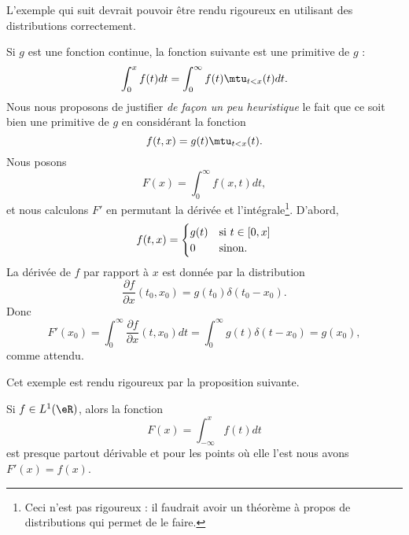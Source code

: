 L'exemple qui suit devrait pouvoir être rendu rigoureux en utilisant des distributions correctement.

\begin{example} \label{ExfYXeQg}
    Si \( g\) est une fonction continue, la fonction suivante est une primitive de \( g\) :
    \begin{equation}
        \int_0^xf(t)dt=\int_0^{\infty}f(t)\mtu_{t<x}(t)dt.
    \end{equation}
    Nous nous proposons de justifier \emph{de façon un peu heuristique} le fait que ce soit bien une primitive de \( g\) en considérant la fonction
    \begin{equation}
        f(t,x)=g(t)\mtu_{t<x}(t).
    \end{equation}
    Nous posons
    \begin{equation}
        F(x)=\int_0^{\infty}f(x,t)dt,
    \end{equation}
    et nous calculons \( F'\) en permutant la dérivée et l'intégrale\footnote{Ceci n'est pas rigoureux : il faudrait avoir un théorème à propos de distributions qui permet de le faire.}. D'abord,
    \begin{equation}
        f(t,x)=\begin{cases}
            g(t)    &   \text{si \( t\in \mathopen[ 0 , x \mathclose]\)}\\
            0    &    \text{sinon.}
        \end{cases}
    \end{equation}
    La dérivée de \( f\) par rapport à \( x\) est donnée par la distribution
    \begin{equation}
        \frac{ \partial f }{ \partial x }(t_0,x_0)=g(t_0)\delta(t_0-x_0).
    \end{equation}
    Donc
    \begin{equation}
        F'(x_0)=\int_0^{\infty}\frac{ \partial f }{ \partial x }(t,x_0)dt=\int_0^{\infty}g(t)\delta(t-x_0)=g(x_0),
    \end{equation}
    comme attendu.
\end{example}

Cet exemple est rendu rigoureux par la proposition suivante.
\begin{proposition} \label{PropJLnPpaw}
    Si \( f\in L^1(\eR)\), alors la fonction
    \begin{equation}
        F(x)=\int_{-\infty}^xf(t)dt
    \end{equation}
    est presque partout dérivable et pour les points où elle l'est nous avons \( F'(x)=f(x)\).
\end{proposition}

